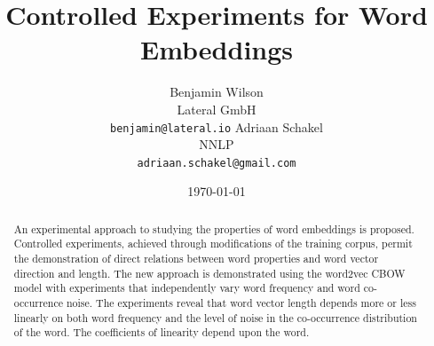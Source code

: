 \documentclass{article} %
\title{Controlled Experiments for Word Embeddings}
\author{
 	Benjamin Wilson\\
	Lateral GmbH\\
	\texttt{benjamin@lateral.io}
	\And
	Adriaan Schakel\\
	NNLP\\
	\texttt{adriaan.schakel@gmail.com}
 }
\date{\today}
\begin{document}
\graphicspath{{../outputs/}}
\maketitle

\begin{abstract}
	An experimental approach to studying the properties of word
        embeddings is proposed.  Controlled experiments, achieved
        through modifications of the training corpus, permit the
        demonstration of direct relations between word properties and
        word vector direction and length.  The new approach is
        demonstrated using the word2vec CBOW model with experiments that
        independently vary word frequency and word co-occurrence noise.
        The experiments reveal that word vector length depends more or
        less linearly on both word frequency and the level of noise in
        the co-occurrence distribution of the word.  The coefficients of
        linearity depend upon the word.
\end{abstract} 
\end{document}
